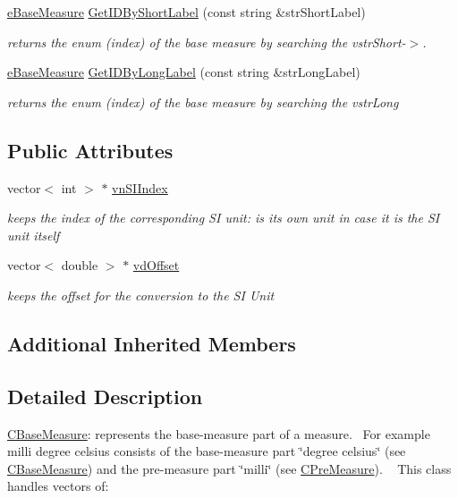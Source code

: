 \begin{DoxyCompactItemize}
\hyperlink{BaseMeasure_8h_ac90e5164ccf1f0d648fba7e94b229a11}{e\+Base\+Measure} \hyperlink{classCBaseMeasure_a8476cf22a5fdcde4df0efc05cde70b45}{Get\+I\+D\+By\+Short\+Label} (const string \&str\+Short\+Label)
\begin{DoxyCompactList}\small\item\em returns the enum (index) of the base measure by searching the vstr\+Short-\/$>$. \end{DoxyCompactList}\item 
\hyperlink{BaseMeasure_8h_ac90e5164ccf1f0d648fba7e94b229a11}{e\+Base\+Measure} \hyperlink{classCBaseMeasure_a5c55d072ffe8e9b5fbe7713039987084}{Get\+I\+D\+By\+Long\+Label} (const string \&str\+Long\+Label)
\begin{DoxyCompactList}\small\item\em returns the enum (index) of the base measure by searching the vstr\+Long \end{DoxyCompactList}\end{DoxyCompactItemize}
\subsection*{Public Attributes}
\begin{DoxyCompactItemize}
\item 
vector$<$ int $>$ $\ast$ \hyperlink{classCBaseMeasure_aaaddf8a6ce321b282885953439472390}{vn\+S\+I\+Index}
\begin{DoxyCompactList}\small\item\em keeps the index of the corresponding SI unit\+: is its own unit in case it is the SI unit itself \end{DoxyCompactList}\item 
vector$<$ double $>$ $\ast$ \hyperlink{classCBaseMeasure_a7220e3dfd4fbdd319a5c3c6af844259e}{vd\+Offset}
\begin{DoxyCompactList}\small\item\em keeps the offset for the conversion to the SI Unit \end{DoxyCompactList}\end{DoxyCompactItemize}
\subsection*{Additional Inherited Members}


\subsection{Detailed Description}
\hyperlink{classCBaseMeasure}{C\+Base\+Measure}\+: represents the base-\/measure part of a measure.~\newline
 For example milli degree celsius consists of the base-\/measure part \char`\"{}degree celsius\char`\"{} (see \hyperlink{classCBaseMeasure}{C\+Base\+Measure}) and the pre-\/measure part \char`\"{}milli\char`\"{} (see \hyperlink{classCPreMeasure}{C\+Pre\+Measure}). ~\newline
 This class handles vectors of\+: 


